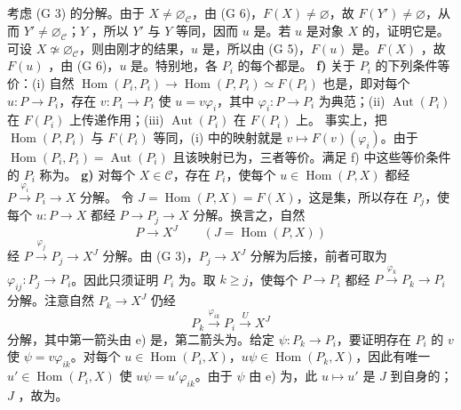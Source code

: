 考虑 (G 3) 的分解。由于 $X\neq\varnothing_{\mathcal C}$，由 (G 6)，$F(X)\neq\varnothing$，故 $F(Y')\neq\varnothing$，从而 $Y'\neq\varnothing_{\mathcal C}$；$Y$ ，所以 $Y'$ 与 $Y$ 等同，因而 $u$ 是。若 $u$ 是对象 $X$ 的，证明它是。可设 $X\not\simeq\varnothing_{\mathcal C}$，则由刚才的结果，$u$ 是，所以由 (G 5)，$F(u)$ 是。$F(X)$ ，故 $F(u)$ ，由 (G 6)，$u$ 是。特别地，各 $P_i$ 的每个都是。
\textbf{f)} 关于 $P_i$ 的下列条件等价：(i) 自然 $\operatorname{Hom}(P_i,P_i)\to\operatorname{Hom}(P,P_i)\simeq F(P_i)$ 也是，即对每个 $u:P\to P_i$，存在 $v:P_i\to P_i$ 使 $u=v\varphi_i$，其中 $\varphi_i:P\to P_i$ 为典范；(ii) $\operatorname{Aut}(P_i)$ 在 $F(P_i)$ 上传递作用；(iii) $\operatorname{Aut}(P_i)$ 在 $F(P_i)$ 上。
事实上，把 $\operatorname{Hom}(P,P_i)$ 与 $F(P_i)$ 等同，(i) 中的映射就是 $v\mapsto F(v)(\varphi_i)$。由于 $\operatorname{Hom}(P_i,P_i)=\operatorname{Aut}(P_i)$ 且该映射已为，三者等价。满足 f) 中这些等价条件的 $P_i$ 称为。
\textbf{g)} 对每个 $X\in\mathcal C$，存在 $P_i$，使每个 $u\in\operatorname{Hom}(P,X)$ 都经 $P\xrightarrow{\varphi_i}P_i\to X$ 分解。
令 $J=\operatorname{Hom}(P,X)=F(X)$，这是集，所以存在 $P_j$，使每个 $u:P\to X$ 都经 $P\to P_j\to X$ 分解。换言之，自然
\[P\longrightarrow X^J\qquad(J=\operatorname{Hom}(P,X))\]
经 $P\xrightarrow{\varphi_j}P_j\to X^J$ 分解。由 (G 3)，$P_j\to X^J$ 分解为后接，前者可取为 $\varphi_{ij}:P_j\to P_i$。因此只须证明 $P_i$ 为。取 $k\geq j$，使每个 $P\to P_i$ 都经 $P\xrightarrow{\varphi_k}P_k\to P_i$ 分解。注意自然 $P_k\to X^J$ 仍经
\[P_k\xrightarrow{\varphi_{ik}}P_i\xrightarrow{U}X^J\]
分解，其中第一箭头由 e) 是，第二箭头为。给定 $\psi:P_k\to P_i$，要证明存在 $P_i$ 的 $v$ 使 $\psi=v\varphi_{ik}$。对每个 $u\in\operatorname{Hom}(P_i,X)$，$u\psi\in\operatorname{Hom}(P_k,X)$，因此有唯一 $u'\in\operatorname{Hom}(P_i,X)$ 使 $u\psi=u'\varphi_{ik}$。由于 $\psi$ 由 e) 为，此 $u\mapsto u'$ 是 $J$ 到自身的；$J$ ，故为。
